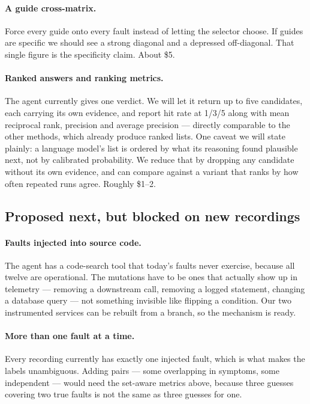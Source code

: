 \paragraph{A guide cross-matrix.} Force every guide onto every fault instead of
letting the selector choose. If guides are specific we should see a strong diagonal
and a depressed off-diagonal. That single figure is the specificity claim. About \$5.

\paragraph{Ranked answers and ranking metrics.} The agent currently gives one verdict.
We will let it return up to five candidates, each carrying its own evidence, and
report hit rate at 1/3/5 along with mean reciprocal rank, precision and average
precision --- directly comparable to the other methods, which already produce ranked
lists. One caveat we will state plainly: a language model's list is ordered by what
its reasoning found plausible next, not by calibrated probability. We reduce that by
dropping any candidate without its own evidence, and can compare against a variant
that ranks by how often repeated runs agree. Roughly \$1--2.

\subsection{Proposed next, but blocked on new recordings}

\paragraph{Faults injected into source code.} The agent has a code-search tool that
today's faults never exercise, because all twelve are operational. The mutations have
to be ones that actually show up in telemetry --- removing a downstream call, removing
a logged statement, changing a database query --- not something invisible like
flipping a condition. Our two instrumented services can be rebuilt from a branch, so
the mechanism is ready.

\paragraph{More than one fault at a time.} Every recording currently has exactly one
injected fault, which is what makes the labels unambiguous. Adding pairs --- some
overlapping in symptoms, some independent --- would need the set-aware metrics above,
because three guesses covering two true faults is not the same as three guesses for
one.

